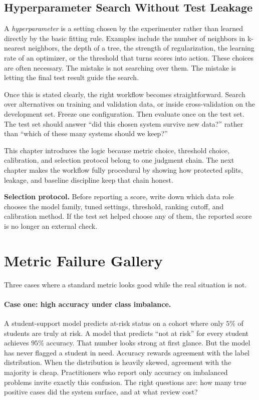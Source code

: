 \subsection{Hyperparameter Search Without Test Leakage}

A \emph{hyperparameter} is a setting chosen by the experimenter rather than learned directly by the basic fitting rule. Examples include the number of neighbors in k-nearest neighbors, the depth of a tree, the strength of regularization, the learning rate of an optimizer, or the threshold that turns scores into action. These choices are often necessary. The mistake is not searching over them. The mistake is letting the final test result guide the search.

Once this is stated clearly, the right workflow becomes straightforward. Search over alternatives on training and validation data, or inside cross-validation on the development set. Freeze one configuration. Then evaluate once on the test set. The test set should answer ``did this chosen system survive new data?'' rather than ``which of these many systems should we keep?''

\begin{practicalnote}
This chapter introduces the logic because metric choice, threshold choice, calibration, and selection protocol belong to one judgment chain. The next chapter makes the workflow fully procedural by showing how protected splits, leakage, and baseline discipline keep that chain honest.
\end{practicalnote}

\begin{thinkingtool}
\textbf{Selection protocol.} Before reporting a score, write down which data role chooses the model family, tuned settings, threshold, ranking cutoff, and calibration method. If the test set helped choose any of them, the reported score is no longer an external check.
\end{thinkingtool}

\section{Metric Failure Gallery}

Three cases where a standard metric looks good while the real situation is not.

\paragraph{Case one: high accuracy under class imbalance.} A student-support model predicts at-risk status on a cohort where only $5\%$ of students are truly at risk. A model that predicts ``not at risk'' for every student achieves $95\%$ accuracy. That number looks strong at first glance. But the model has never flagged a student in need. Accuracy rewards agreement with the label distribution. When the distribution is heavily skewed, agreement with the majority is cheap. Practitioners who report only accuracy on imbalanced problems invite exactly this confusion. The right questions are: how many true positive cases did the system surface, and at what review cost?


